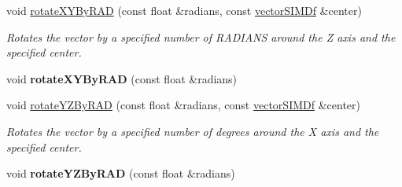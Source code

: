 \begin{DoxyCompactItemize}
\item 
void \hyperlink{classirr_1_1core_1_1vectorSIMDf_aebb03507a44d912b262571d74ccf735e}{rotate\+X\+Y\+By\+R\+AD} (const float \&radians, const \hyperlink{classirr_1_1core_1_1vectorSIMDf}{vector\+S\+I\+M\+Df} \&center)
\begin{DoxyCompactList}\small\item\em Rotates the vector by a specified number of R\+A\+D\+I\+A\+NS around the Z axis and the specified center. \end{DoxyCompactList}\item 
void {\bfseries rotate\+X\+Y\+By\+R\+AD} (const float \&radians)\hypertarget{classirr_1_1core_1_1vectorSIMDf_aecd35a05d41780b6f058120f8a2ea1fe}{}\label{classirr_1_1core_1_1vectorSIMDf_aecd35a05d41780b6f058120f8a2ea1fe}

\item 
void \hyperlink{classirr_1_1core_1_1vectorSIMDf_a8ab5b905241accbc598af956e1dd3921}{rotate\+Y\+Z\+By\+R\+AD} (const float \&radians, const \hyperlink{classirr_1_1core_1_1vectorSIMDf}{vector\+S\+I\+M\+Df} \&center)
\begin{DoxyCompactList}\small\item\em Rotates the vector by a specified number of degrees around the X axis and the specified center. \end{DoxyCompactList}\item 
void {\bfseries rotate\+Y\+Z\+By\+R\+AD} (const float \&radians)\hypertarget{classirr_1_1core_1_1vectorSIMDf_ace671cb6474d577aec1b368327791ce9}{}\label{classirr_1_1core_1_1vectorSIMDf_ace671cb6474d577aec1b368327791ce9}

\end{DoxyCompactItemize}
